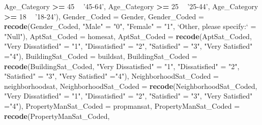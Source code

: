 \documentclass[]{article}
\newenvironment{Shaded}{\begin{snugshade}}{\end{snugshade}}
\newcommand{\DataTypeTok}[1]{\textcolor[rgb]{0.13,0.29,0.53}{#1}}
\newcommand{\DecValTok}[1]{\textcolor[rgb]{0.00,0.00,0.81}{#1}}
\newcommand{\KeywordTok}[1]{\textcolor[rgb]{0.13,0.29,0.53}{\textbf{#1}}}
\newcommand{\NormalTok}[1]{#1}
\newcommand{\OperatorTok}[1]{\textcolor[rgb]{0.81,0.36,0.00}{\textbf{#1}}}
\newcommand{\StringTok}[1]{\textcolor[rgb]{0.31,0.60,0.02}{#1}}
\begin{document}
\begin{Shaded}
\begin{Highlighting}[]
{{{\NormalTok{                    Age_Category }\OperatorTok{>=}\StringTok{ }\DecValTok{45}  \OperatorTok{~}\StringTok{ '45-64'}\NormalTok{,}
\NormalTok{                    Age_Category }\OperatorTok{>=}\StringTok{ }\DecValTok{25} \OperatorTok{~}\StringTok{ '25-44'}\NormalTok{,}
\NormalTok{                    Age_Category }\OperatorTok{>=}\StringTok{ }\DecValTok{18} \OperatorTok{~}\StringTok{ '18-24'}\NormalTok{),}
    \DataTypeTok{Gender_Coded =}\NormalTok{ Gender, }
    \DataTypeTok{Gender_Coded =} \KeywordTok{recode}\NormalTok{(Gender_Coded, }
                          \StringTok{"Male"}\NormalTok{ =}\StringTok{ "0"}\NormalTok{,}
                          \StringTok{"Female"}\NormalTok{ =}\StringTok{ "1"}\NormalTok{,}
                          \StringTok{`}\DataTypeTok{Other, please specify:}\StringTok{`}\NormalTok{ =}\StringTok{ "Null"}\NormalTok{),}
    \DataTypeTok{AptSat_Coded =}\NormalTok{ homesat, }
    \DataTypeTok{AptSat_Coded =} \KeywordTok{recode}\NormalTok{(AptSat_Coded,}
                          \StringTok{"Very Dissatisfied"}\NormalTok{ =}\StringTok{ "1"}\NormalTok{,}
                          \StringTok{"Dissatisfied"}\NormalTok{ =}\StringTok{ "2"}\NormalTok{, }
                          \StringTok{"Satisfied"}\NormalTok{ =}\StringTok{ "3"}\NormalTok{,}
                          \StringTok{"Very Satisfied"}\NormalTok{ =}\StringTok{"4"}\NormalTok{), }
    \DataTypeTok{BuildingSat_Coded =}\NormalTok{ buildsat, }
    \DataTypeTok{BuildingSat_Coded =} \KeywordTok{recode}\NormalTok{(BuildingSat_Coded,}
                          \StringTok{"Very Dissatisfied"}\NormalTok{ =}\StringTok{ "1"}\NormalTok{,}
                          \StringTok{"Dissatisfied"}\NormalTok{ =}\StringTok{ "2"}\NormalTok{, }
                          \StringTok{"Satisfied"}\NormalTok{ =}\StringTok{ "3"}\NormalTok{,}
                          \StringTok{"Very Satisfied"}\NormalTok{ =}\StringTok{"4"}\NormalTok{),}
    \DataTypeTok{NeighborhoodSat_Coded =}\NormalTok{ neighborhoodsat, }
    \DataTypeTok{NeighborhoodSat_Coded =} \KeywordTok{recode}\NormalTok{(NeighborhoodSat_Coded,}
                          \StringTok{"Very Dissatisfied"}\NormalTok{ =}\StringTok{ "1"}\NormalTok{,}
                          \StringTok{"Dissatisfied"}\NormalTok{ =}\StringTok{ "2"}\NormalTok{, }
                          \StringTok{"Satisfied"}\NormalTok{ =}\StringTok{ "3"}\NormalTok{,}
                          \StringTok{"Very Satisfied"}\NormalTok{ =}\StringTok{"4"}\NormalTok{),}
   \DataTypeTok{PropertyManSat_Coded =}\NormalTok{ propmansat,}
   \DataTypeTok{PropertyManSat_Coded =} \KeywordTok{recode}\NormalTok{(PropertyManSat_Coded,}
}}}
\end{Highlighting}
\end{Shaded}
\end{document}
